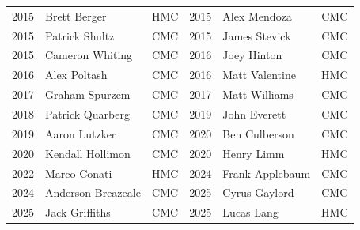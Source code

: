 \begin{table}[H]
{\begin{tabular}{c l c | c l c}
2015 & Brett Berger & HMC & 2015 & Alex Mendoza & CMC \\
2015 & Patrick Shultz & CMC & 2015 & James Stevick & CMC \\
2015 & Cameron Whiting & CMC & 2016 & Joey Hinton & CMC \\
2016 & Alex Poltash & CMC & 2016 & Matt Valentine & HMC \\
2017 & Graham Spurzem & CMC & 2017 & Matt Williams & CMC \\
2018 & Patrick Quarberg & CMC & 2019 & John Everett & CMC \\
2019 & Aaron Lutzker & CMC & 2020 & Ben Culberson & CMC \\
2020 & Kendall Hollimon & CMC & 2020 & Henry Limm & HMC \\
2022 & Marco Conati & HMC & 2024 & Frank Applebaum & CMC \\
2024 & Anderson Breazeale & CMC & 2025 & Cyrus Gaylord & CMC \\
2025 & Jack Griffiths & CMC & 2025 & Lucas Lang & HMC \\
\bottomrule
\end{tabular}%
}
\end{table}

